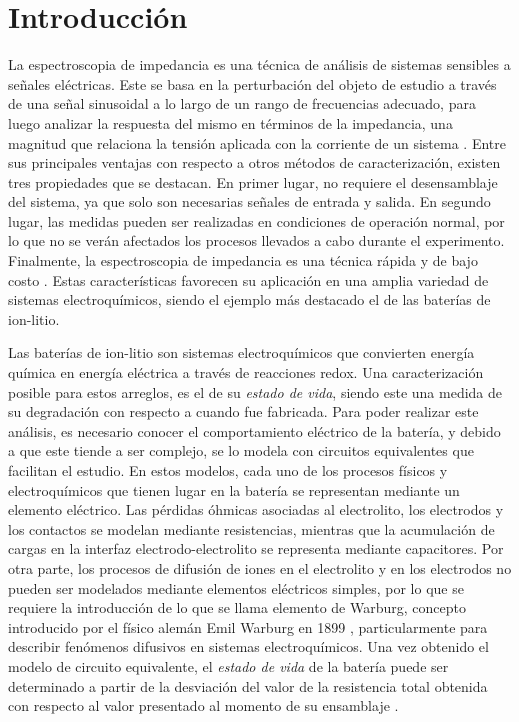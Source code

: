 \section{Introducción}

        La espectroscopia de impedancia es una técnica de análisis de sistemas sensibles a señales eléctricas. Este se basa en la perturbación del objeto de estudio a través de una señal sinusoidal a lo largo de un rango de frecuencias adecuado, para luego analizar la respuesta del mismo en términos de la impedancia, una magnitud que relaciona la tensión aplicada con la corriente de un sistema \cite{Faulkner,Tutorial}. Entre sus principales ventajas con respecto a otros métodos de caracterización, existen tres propiedades que se destacan. En primer lugar, no requiere el desensamblaje del sistema, ya que solo son necesarias señales de entrada y salida. En segundo lugar, las medidas pueden ser realizadas en condiciones de operación normal, por lo que no se verán afectados los procesos llevados a cabo durante el experimento. Finalmente, la espectroscopia de impedancia es una técnica rápida y de bajo costo \cite{modeling}. Estas características favorecen su aplicación en una amplia variedad de sistemas electroquímicos, siendo el ejemplo más destacado el de las baterías de ion-litio.

        Las baterías de ion-litio son sistemas electroquímicos que convierten energía química en energía eléctrica a través de reacciones redox. Una caracterización posible para estos arreglos, es el de su \textit{estado de vida}, siendo este una medida de su degradación con respecto a cuando fue fabricada. Para poder realizar este análisis, es necesario conocer el comportamiento eléctrico de la batería, y debido a que este tiende a ser complejo, se lo modela con circuitos equivalentes que facilitan el estudio. En estos modelos, cada uno de los procesos físicos y electroquímicos que tienen lugar en la batería se representan mediante un elemento eléctrico. Las pérdidas óhmicas asociadas al electrolito, los electrodos y los contactos se modelan mediante resistencias, mientras que la acumulación de cargas en la interfaz electrodo-electrolito se representa mediante capacitores. Por otra parte, los procesos de difusión de iones en el electrolito y en los electrodos no pueden ser modelados mediante elementos eléctricos simples, por lo que se requiere la introducción de lo que se llama elemento de Warburg, concepto introducido por el físico alemán Emil Warburg en 1899 \cite{warburg}, particularmente para describir fenómenos difusivos en sistemas electroquímicos. Una vez obtenido el modelo de circuito equivalente, el \textit{estado de vida} de la batería puede ser determinado a partir de la desviación del valor de la resistencia total obtenida con respecto al valor presentado al momento de su ensamblaje \cite{modeling}.

